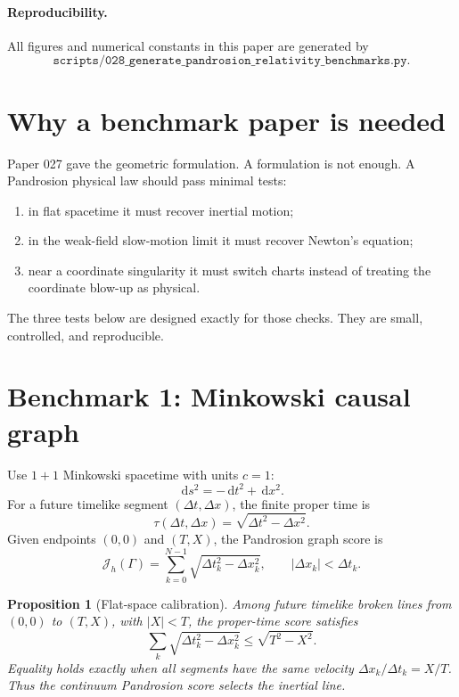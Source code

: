 \documentclass[11pt]{article}
\newtheorem{proposition}[definition]{Proposition}
\newcommand{\J}{\mathcal J}
\newcommand{\dd}{\,\mathrm d}
\begin{document}
\paragraph{Reproducibility.}
All figures and numerical constants in this paper are generated by
\[
        \texttt{scripts/028\_generate\_pandrosion\_relativity\_benchmarks.py}.
\]

\tableofcontents

\section{Why a benchmark paper is needed}

Paper 027 gave the geometric formulation.  A formulation is not enough.  A
Pandrosion physical law should pass minimal tests:
\begin{enumerate}[label=(\roman*)]
\item in flat spacetime it must recover inertial motion;
\item in the weak-field slow-motion limit it must recover Newton's equation;
\item near a coordinate singularity it must switch charts instead of treating
the coordinate blow-up as physical.
\end{enumerate}
The three tests below are designed exactly for those checks.  They are small,
controlled, and reproducible.

\section{Benchmark 1: Minkowski causal graph}

Use \(1+1\) Minkowski spacetime with units \(c=1\):
\[
        \dd s^2=-\dd t^2+\dd x^2.
\]
For a future timelike segment \((\Delta t,\Delta x)\), the finite proper time
is
\[
        \tau(\Delta t,\Delta x)
        =
        \sqrt{\Delta t^2-\Delta x^2}.
\]
Given endpoints \((0,0)\) and \((T,X)\), the Pandrosion graph score is
\[
        \J_h(\Gamma)
        =
        \sum_{k=0}^{N-1}
        \sqrt{\Delta t_k^2-\Delta x_k^2},
        \qquad |\Delta x_k|<\Delta t_k.
\]

\begin{proposition}[Flat-space calibration]
Among future timelike broken lines from \((0,0)\) to \((T,X)\), with
\(|X|<T\), the proper-time score satisfies
\[
        \sum_k \sqrt{\Delta t_k^2-\Delta x_k^2}
        \le
        \sqrt{T^2-X^2}.
\]
Equality holds exactly when all segments have the same velocity
\(\Delta x_k/\Delta t_k=X/T\).  Thus the continuum Pandrosion score selects
the inertial line.
\end{proposition}
\end{document}
